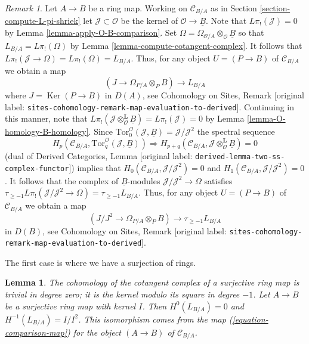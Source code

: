 \documentclass[10pt,a4paper]{article}
\newenvironment{slogan}{\comment}{\endcomment}
\theoremstyle{plain}
\newtheorem{lemma}[subsection]{Lemma}
\theoremstyle{definition}
\theoremstyle{remark}
\newtheorem{remark}[subsection]{Remark}
\numberwithin{equation}{subsection}
\def\Ker{\mathop{\mathrm{Ker}}}
\begin{document}
\begin{remark}
\label{remark-make-map}
Let $A \to B$ be a ring map.  Working on $\mathcal{C}_{B/A}$ as in
Section \ref{section-compute-L-pi-shriek} let
$\mathcal{J} \subset \mathcal{O}$ be the kernel of
$\mathcal{O} \to \underline{B}$. Note that $L\pi_!(\mathcal{J}) = 0$ by
Lemma \ref{lemma-apply-O-B-comparison}. Set
$\Omega =  \Omega_{\mathcal{O}/A} \otimes_\mathcal{O} \underline{B}$
so that
$L_{B/A} = L\pi_!(\Omega)$ by Lemma \ref{lemma-compute-cotangent-complex}.
It follows that $L\pi_!(\mathcal{J} \to \Omega) = L\pi_!(\Omega) = L_{B/A}$.
Thus, for any object $U = (P \to B)$ of $\mathcal{C}_{B/A}$ we obtain a map
\begin{equation}
\label{equation-comparison-map-A}
(J \to \Omega_{P/A} \otimes_P B) \longrightarrow L_{B/A}
\end{equation}
where $J = \Ker(P \to B)$ in $D(A)$, see
Cohomology on Sites, Remark
\textnormal{[original label: \nolinkurl{sites-cohomology-remark-map-evaluation-to-derived}]}.
Continuing in this manner, note that
$L\pi_!(\mathcal{J} \otimes_\mathcal{O}^\mathbf{L} \underline{B}) =
L\pi_!(\mathcal{J}) = 0$ by
Lemma \ref{lemma-O-homology-B-homology}.
Since $\text{Tor}_0^\mathcal{O}(\mathcal{J}, \underline{B}) =
\mathcal{J}/\mathcal{J}^2$
the spectral sequence
$$
H_p(\mathcal{C}_{B/A}, \text{Tor}_q^\mathcal{O}(\mathcal{J}, \underline{B}))
\Rightarrow 
H_{p + q}(\mathcal{C}_{B/A},
\mathcal{J} \otimes_\mathcal{O}^\mathbf{L} \underline{B}) = 0
$$
(dual of
Derived Categories, Lemma \textnormal{[original label: \nolinkurl{derived-lemma-two-ss-complex-functor}]})
implies that
$H_0(\mathcal{C}_{B/A}, \mathcal{J}/\mathcal{J}^2) = 0$
and $H_1(\mathcal{C}_{B/A}, \mathcal{J}/\mathcal{J}^2) = 0$.
It follows that the complex of $\underline{B}$-modules
$\mathcal{J}/\mathcal{J}^2 \to \Omega$ satisfies
$\tau_{\geq -1}L\pi_!(\mathcal{J}/\mathcal{J}^2 \to \Omega) =
\tau_{\geq -1}L_{B/A}$.
Thus, for any object $U = (P \to B)$ of $\mathcal{C}_{B/A}$ we obtain a map
\begin{equation}
\label{equation-comparison-map}
(J/J^2 \to \Omega_{P/A} \otimes_P B) \longrightarrow \tau_{\geq -1}L_{B/A}
\end{equation}
in $D(B)$, see
Cohomology on Sites, Remark
\textnormal{[original label: \nolinkurl{sites-cohomology-remark-map-evaluation-to-derived}]}.
\end{remark}

\noindent
The first case is where we have a surjection of rings.

\begin{lemma}
\label{lemma-surjection}
\begin{slogan}
The cohomology of the cotangent complex of a surjective ring map is trivial in
degree zero; it is the kernel modulo its square in degree $-1$.
\end{slogan}
Let $A \to B$ be a surjective ring map with kernel $I$.
Then $H^0(L_{B/A}) = 0$ and $H^{-1}(L_{B/A}) = I/I^2$.
This isomorphism comes from the map (\ref{equation-comparison-map})
for the object $(A \to B)$ of $\mathcal{C}_{B/A}$.
\end{lemma}
\end{document}
